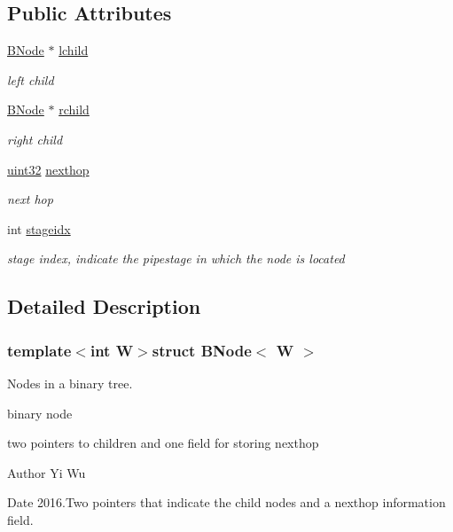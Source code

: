 \subsection*{Public Attributes}
\begin{DoxyCompactItemize}
\item 
\hyperlink{structBNode}{B\-Node} $\ast$ \hyperlink{structBNode_a1ad4a790c2a55b13d8d49eba62ffd7c7}{lchild}
\begin{DoxyCompactList}\small\item\em left child \end{DoxyCompactList}\item 
\hyperlink{structBNode}{B\-Node} $\ast$ \hyperlink{structBNode_a97d5c95d581d02c15e4f531ea20da995}{rchild}
\begin{DoxyCompactList}\small\item\em right child \end{DoxyCompactList}\item 
\hyperlink{types_8h_abd01e8e67e3d94cab04ecaaf4f85ac1b}{uint32} \hyperlink{structBNode_a6fbf88d8991ddb35540059726e14111c}{nexthop}
\begin{DoxyCompactList}\small\item\em next hop \end{DoxyCompactList}\item 
int \hyperlink{structBNode_adebd283b08369a1499a95d23f0268ecc}{stageidx}
\begin{DoxyCompactList}\small\item\em stage index, indicate the pipestage in which the node is located \end{DoxyCompactList}\end{DoxyCompactItemize}


\subsection{Detailed Description}
\subsubsection*{template$<$int W$>$struct B\-Node$<$ W $>$}

Nodes in a binary tree. 

binary node

two pointers to children and one field for storing nexthop

\begin{DoxyAuthor}{Author}
Yi Wu 
\end{DoxyAuthor}
\begin{DoxyDate}{Date}
2016.\-Two pointers that indicate the child nodes and a nexthop information field.
\end{DoxyDate}


